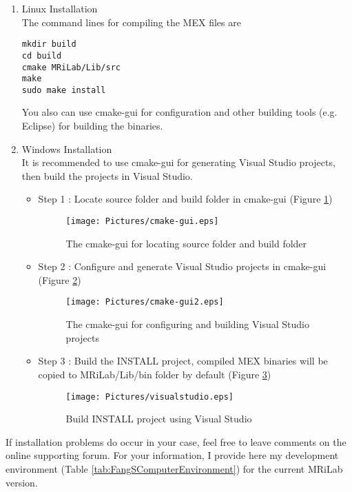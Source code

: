 \documentclass{book}%
\begin{document}
\begin{enumerate}
\item Linux Installation \\
The command lines for compiling the MEX files are 
\begin{verbatim}
mkdir build
cd build
cmake MRiLab/Lib/src
make
sudo make install
\end{verbatim}

You also can use cmake-gui for configuration and other building tools (e.g. Eclipse) for building the binaries.

\item Windows Installation \\
It is recommended to use cmake-gui for generating Visual Studio projects, then build the projects in Visual Studio.

\begin{itemize}
	\item Step 1 : Locate source folder and build folder in cmake-gui (Figure \ref{fig:cmake-gui})
		\begin{figure}[htbp]
			\centering
				\texttt{[image: Pictures/cmake-gui.eps]}
			\caption{The cmake-gui for locating source folder and build folder}
			\label{fig:cmake-gui}
		\end{figure}
	\item Step 2 : Configure and generate Visual Studio projects in cmake-gui (Figure \ref{fig:cmake-gui2})
		\begin{figure}[htbp]
			\centering
				\texttt{[image: Pictures/cmake-gui2.eps]}
			\caption{The cmake-gui for configuring and building Visual Studio projects}
			\label{fig:cmake-gui2}
		\end{figure}
	\item Step 3 : Build the INSTALL project, compiled MEX binaries will be copied to MRiLab/Lib/bin folder by default (Figure \ref{fig:visualstudio})
		\begin{figure}[htbp]
			\centering
				\texttt{[image: Pictures/visualstudio.eps]}
			\caption{Build INSTALL project using Visual Studio}
			\label{fig:visualstudio}
		\end{figure}
	
\end{itemize}

\end{enumerate}

If installation problems do occur in your case, feel free to leave comments on the online supporting forum. For your information, I provide here my development environment (Table \ref {tab:FangSComputerEnvironment}) for the current MRiLab version.
\end{document}
